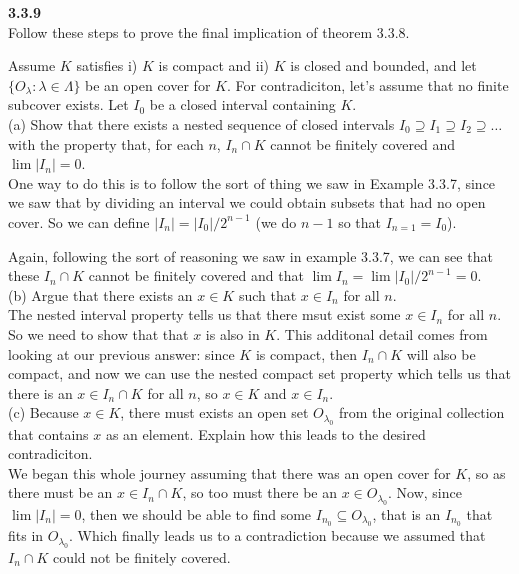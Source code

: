 \textbf{3.3.9}
\\

Follow these steps to prove the final implication of theorem 3.3.8.

Assume $K$ satisfies i) $K$ is compact and ii) $K$ is closed and bounded, and let
$\{ O_\lambda : \lambda \in \Lambda \}$ be an open cover for $K$.
For contradiciton, let's assume that no finite subcover exists.
Let $I_0$ be a closed interval containing $K$.
\\

(a) Show that there exists a nested sequence of closed intervals $I_0 \supseteq I_1 \supseteq I_2 \supseteq \ldots$
with the property that, for each $n$, $I_n \cap K$ cannot be finitely covered and $\lim |I_n| = 0$.
\\

One way to do this is to follow the sort of thing we saw in Example 3.3.7, since we saw that by dividing an
interval we could obtain subsets that had no open cover.
So we can define $|I_n| = |I_0| / 2^{n-1}$ (we do $n-1$ so that $I_{n=1} = I_0$).

Again, following the sort of reasoning we saw in example 3.3.7, we can see that these $I_n \cap K$ cannot be finitely
covered and that $\lim I_n = \lim |I_0|/2^{n-1} = 0$.
\\

(b) Argue that there exists an $x\in K$ such that $x \in I_n$ for all $n$.
\\

The nested interval property tells us that there msut exist some $x \in I_n$ for all $n$.
So we need to show that that $x$ is also in $K$.
This additonal detail comes from looking at our previous answer: since $K$ is compact, then $I_n \cap K$
will also be compact, and now we can use the nested compact set property which tells us that
there is an $x \in I_n \cap K$ for all $n$, so $x\in K$ and $x\in I_n$.
\\

(c) Because $x\in K$, there must exists an open set $O_{\lambda_0}$ from the original collection that
contains $x$ as an element.
Explain how this leads to the desired contradiciton.
\\

We began this whole journey assuming that there was an open cover for $K$, so as there must be an
$x \in I_n \cap K$, so too must there be an $x \in O_{\lambda_0}$.
Now, since $\lim |I_n| = 0$, then we should be able to find some $I_{n_0} \subseteq O_{\lambda_0}$,
that is an $I_{n_0}$ that fits in $O_{\lambda_0}$.
Which finally leads us to a contradiction because we assumed that $I_n \cap K$ could not be finitely covered.
\\~\\




